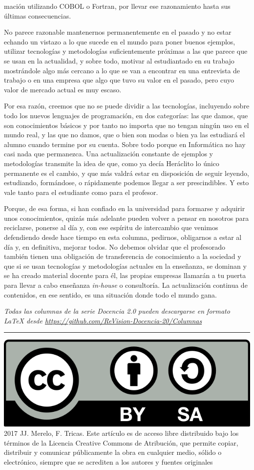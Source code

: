 \documentclass[twoside,10pt]{article}
\newcommand{\surl}[1]{{\small\url{#1}}}
\newcounter{vol}
\begin{document}
\begin{multicols}{2}
\noindent 
mación utilizando COBOL o Fortran, por llevar
ese razonamiento hasta sus últimas consecuencias. 


No parece razonable mantenernos permanentemente en el pasado y no
estar
echando un vistazo a lo que sucede en el mundo para poner
buenos ejemplos, utilizar tecnologías y metodologías suficientemente
próximas
a las que parece que se usan en la actualidad, y sobre todo,
motivar al estudiantado en su trabajo mostrándole algo más cercano a
lo que se van a encontrar en una entrevista de trabajo o en una
empresa que algo que tuvo su valor en el pasado, pero cuyo valor de
mercado actual es muy escaso. 

Por esa razón, creemos que no se puede dividir a
las tecnologías, incluyendo sobre todo los nuevos lenguajes de
programación, en dos categorías: las que damos, que son
conocimientos básicos y por tanto no importa que no tengan
ningún uso en el mundo real, y las que no damos, que o bien
son modas o bien ya las estudiará el alumno cuando termine por
su cuenta. Sobre todo porque en Informática no hay casi nada que
permanezca. Una
actualización constante de ejemplos y metodologías transmite la idea
de que, como ya decía Heráclito lo único permanente es el cambio, y
que más valdrá estar en disposición de seguir leyendo, estudiando,
formándose, o rápidamente podemos llegar a ser prescindibles.  Y esto
vale tanto para el estudiante como para el profesor. 

Porque, de esa forma, si han confiado en la universidad para formarse
y adquirir unos conocimientos, quizás más adelante pueden volver a
pensar en nosotros para reciclarse, ponerse al día y, con ese espíritu
de intercambio que venimos defendiendo desde hace tiempo en esta
columna, pedirnos, obligarnos a estar al día y, en definitiva, mejorar
todos. No debemos olvidar que el profesorado también tienen una
obligación de transferencia de conocimiento a la sociedad y que si se
usan tecnologías y metodologías actuales en la enseñanza, se dominan y
se ha creado material docente para él, las propias empresas llamarán a
tu puerta para llevar a cabo enseñanza {\em in-house} o
consultoría. La actualización continua de contenidos, en ese sentido,
es una situación donde todo el mundo gana. 

\medskip

\noindent\emph{Todas las columnas de la serie Docencia 2.0
pueden descargarse en formato LaTeX desde
\surl{https://github.com/ReVision-Docencia-20/Columnas}}

\noindent\rule{90mm}{1pt}

{\small \noindent\includegraphics[height = 4ex]{CC.png} 2017 JJ.
Merelo, F. Tricas. Este artículo es de acceso libre distribuido bajo
los términos
de la Licencia Creative Commons de Atribución, que permite copiar,
distribuir y comunicar públicamente la obra en cualquier medio, sólido
o electrónico, siempre que se acrediten a los autores y fuentes
originales}

\end{multicols}
\end{document}
